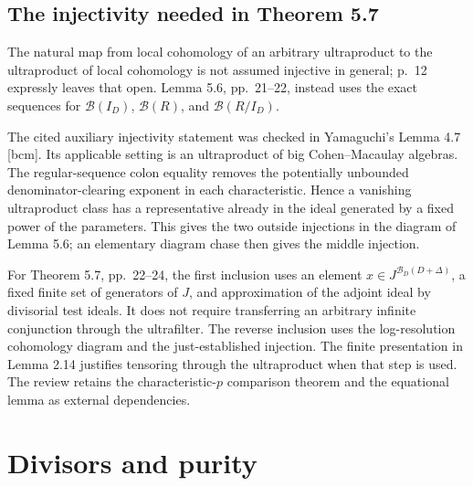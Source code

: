 \documentclass[10pt]{article}
\begin{document}
\subsection*{The injectivity needed in Theorem 5.7}
The natural map from local cohomology of an arbitrary ultraproduct to the ultraproduct of local cohomology is not assumed injective in general; p. 12 expressly leaves that open. Lemma 5.6, pp. 21–22, instead uses the exact sequences for \(\mathcal B(I_D)\), \(\mathcal B(R)\), and \(\mathcal B(R/I_D)\).\par
The cited auxiliary injectivity statement was checked in Yamaguchi’s Lemma 4.7 [bcm]. Its applicable setting is an ultraproduct of big Cohen–Macaulay algebras. The regular-sequence colon equality removes the potentially unbounded denominator-clearing exponent in each characteristic. Hence a vanishing ultraproduct class has a representative already in the ideal generated by a fixed power of the parameters. This gives the two outside injections in the diagram of Lemma 5.6; an elementary diagram chase then gives the middle injection.\par
For Theorem 5.7, pp. 22–24, the first inclusion uses an element \(x\in J^{\mathcal B_D(D+\Delta)}\), a fixed finite set of generators of \(J\), and approximation of the adjoint ideal by divisorial test ideals. It does not require transferring an arbitrary infinite conjunction through the ultrafilter. The reverse inclusion uses the log-resolution cohomology diagram and the just-established injection. The finite presentation in Lemma 2.14 justifies tensoring through the ultraproduct when that step is used. The review retains the characteristic-\(p\) comparison theorem and the equational lemma as external dependencies.\par
\section*{Divisors and purity}
\end{document}
